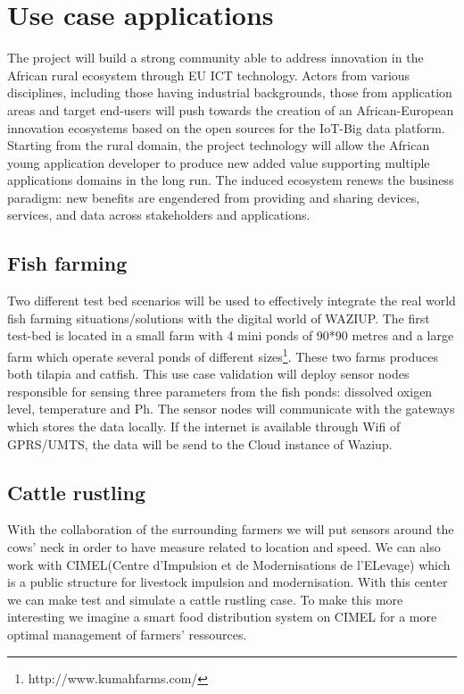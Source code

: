 
\section{Use case applications}
\label{sec:usecases}

The project will build a strong community able to address innovation in the African rural ecosystem through EU ICT technology.
Actors from various disciplines, including those having industrial backgrounds, those from application areas and target end-users will push towards the creation of an African-European innovation ecosystems based on the open sources for the IoT-Big data platform.
Starting from the rural domain, the project technology will allow the
African young application developer to produce new added value supporting multiple applications domains in the long run.
The induced ecosystem renews the business paradigm: new benefits are engendered from providing and sharing devices, services, and data across stakeholders and applications.

\subsection{Fish farming}

Two different test bed scenarios will be used to effectively integrate the real world fish farming situations/solutions with the digital world of WAZIUP.
The first test-bed is located in a small farm with 4 mini ponds of 90*90 metres and a large farm which operate several ponds of different sizes\footnote{http://www.kumahfarms.com/}.
These two farms produces both tilapia and catfish.
This use case validation will deploy sensor nodes responsible for sensing three parameters from the fish ponds: dissolved oxigen level, temperature and Ph.
The sensor nodes will communicate with the gateways which stores the data locally.
If the internet is available through Wifi of GPRS/UMTS, the data will be send to the Cloud instance of Waziup.

\subsection{Cattle rustling}

With the collaboration of the surrounding farmers we will put sensors around the cows’ neck in order to have measure related to location and speed.
We can also work with CIMEL(Centre d’Impulsion et de Modernisations de l’ELevage) which is a public structure for livestock impulsion and modernisation.
With this center we can make test and simulate a cattle rustling case.
To make this more interesting we imagine a smart food distribution system on CIMEL for a more optimal management of farmers’ ressources.

